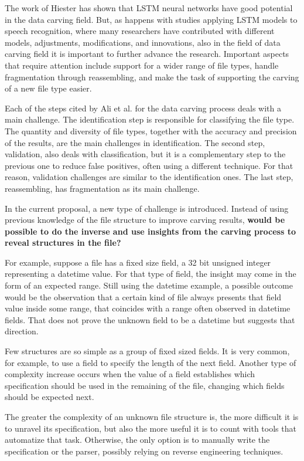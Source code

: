 The work of Hiester \cite{hiester_file_2018} has shown that LSTM neural networks have good potential in the data carving field. But, as happens with studies applying LSTM models to speech recognition, where many researchers have contributed with different models, adjustments, modifications, and innovations, also in the field of data carving field it is important to further advance the research. Important aspects that require attention include support for a wider range of file types, handle fragmentation through reassembling, and make the task of supporting the carving of a new file type easier.

Each of the steps cited by Ali et al. \cite{ali_review_2018} for the data carving process deals with a main challenge. The identification step is responsible for classifying the file type. The quantity and diversity of file types, together with the accuracy and precision of the results, are the main challenges in identification. The second step, validation, also deals with classification, but it is a complementary step to the previous one to reduce false positives, often using a different technique. For that reason, validation challenges are similar to the identification ones. The last step, reassembling, has fragmentation as its main challenge.

In the current proposal, a new type of challenge is introduced. Instead of using previous knowledge of the file structure to improve carving results, \textbf{would be possible to do the inverse and use insights from the carving process to reveal structures in the file?}

For example, suppose a file has a fixed size field, a 32 bit unsigned integer representing a datetime value. 
For that type of field, the insight may come in the form of an expected range. Still using the datetime example, a possible outcome would be the observation that a certain kind of file always presents that field value inside some range, that coincides with a range often observed in datetime fields. That does not prove the unknown field to be a datetime but suggests that direction.

Few structures are so simple as a group of fixed sized fields. It is very common, for example, to use a field to specify the length of the next field. Another type of complexity increase occurs when the value of a field establishes which specification should be used in the remaining of the file, changing which fields should be expected next.

The greater the complexity of an unknown file structure is, the more difficult it is to unravel its specification, but also the more useful it is to count with tools that automatize that task. Otherwise, the only option is to manually write the specification or the parser, possibly relying on reverse engineering techniques.


